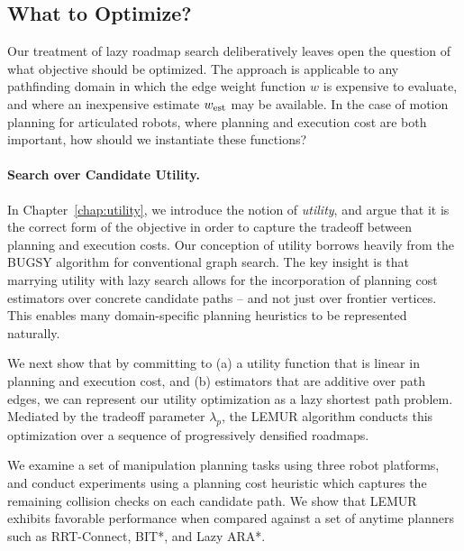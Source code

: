 \subsection{What to Optimize?}
Our treatment of lazy roadmap search deliberatively leaves open
the question of what objective should be optimized.
The approach is applicable to any pathfinding domain in which
the edge weight function $w$ is expensive to evaluate,
and where an inexpensive estimate $w_{\mbox{\scriptsize est}}$ may be available.
In the case of motion planning for articulated robots,
where planning and execution cost are both important,
how should we instantiate these functions?

\paragraph{Search over Candidate Utility.}
In Chapter~\ref{chap:utility},
we introduce the notion of \emph{utility},
and argue that it is the correct form of the objective in order
to capture the tradeoff between planning and execution costs.
Our conception of utility borrows heavily from the BUGSY algorithm
\citep{burns2013bugsy} for conventional graph search.
The key insight is that marrying utility with lazy search
allows for the incorporation of planning cost estimators over
concrete candidate paths -- and not just over frontier vertices.
This enables many domain-specific planning heuristics to be
represented naturally.

We next show that by committing to
(a) a utility function that is linear in planning and execution cost,
and (b) estimators that are additive over path edges,
we can represent our utility optimization as a lazy shortest path
problem.
Mediated by the tradeoff parameter $\lambda_p$,
the LEMUR algorithm
conducts this optimization
over a sequence of progressively densified roadmaps.

We examine a set of manipulation planning tasks using three
robot platforms,
and conduct experiments using a planning cost heuristic which
captures the remaining collision checks on each candidate path.
We show that LEMUR exhibits favorable performance
when compared against a set of anytime planners
such as RRT-Connect, BIT*, and Lazy ARA*.

